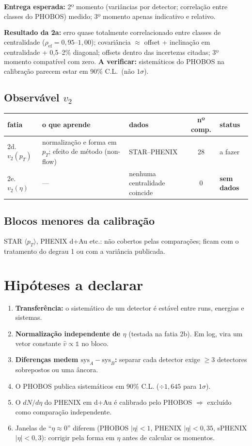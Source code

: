 \documentclass[11pt,a4paper]{article}
\newcommand{\afazer}{\textcolor{black!55}{a fazer}}
\begin{document}
\textbf{Entrega esperada:} 2º momento (variâncias por detector; correlação entre classes do PHOBOS) medido;
3º momento apenas indicativo e relativo.

\textbf{Resultado da 2a:} erro quase totalmente correlacionado entre classes de centralidade ($\rho_{\mathrm{ef}}=0{,}95$--$1{,}00$);
covariância $\approx$ offset + inclinação em centralidade + 0,5--2\% diagonal; offsets dentro das incertezas citadas;
3º momento compatível com zero. \textbf{A verificar:} sistemáticos do PHOBOS na calibração parecem estar em 90\% C.L.\ (não $1\sigma$).

\subsection*{Observável $v_2$}
\begin{tabularx}{\linewidth}{@{}l Y Y c l@{}}
\toprule
fatia & o que aprende & dados & nº comp. & status \\
\midrule
2d. $v_2(p_T)$ & normalização e forma em $p_T$; efeito de método (non-flow) & STAR--PHENIX & 28 & \afazer \\
2e. $v_2(\eta)$ & --- & nenhuma centralidade coincide & 0 & \textbf{sem dados} \\
\bottomrule
\end{tabularx}

\subsection*{Blocos menores da calibração}
STAR $\langle p_T\rangle$, PHENIX d+Au etc.: não cobertos pelas comparações; ficam com o tratamento do degrau 1 ou com a variância publicada.

\section*{Hipóteses a declarar}
\begin{enumerate}[nosep]
\item \textbf{Transferência:} o sistemático de um detector é estável entre runs, energias e sistemas.
\item \textbf{Normalização independente de $\eta$} (testada na fatia 2b). Em log, vira um vetor constante $\hat v\propto\mathbb{1}$ no bloco.
\item \textbf{Diferenças medem $\mathrm{sys}_A-\mathrm{sys}_B$:} separar cada detector exige $\geq3$ detectores sobrepostos ou uma âncora.
\item O PHOBOS publica sistemáticos em 90\% C.L. ($\div1{,}645$ para $1\sigma$).
\item O $dN/d\eta$ do PHENIX em d+Au é calibrado pelo PHOBOS $\Rightarrow$ excluído como comparação independente.
\item Janelas de ``$\eta\approx0$'' diferem (PHOBOS $|\eta|<1$, PHENIX $|\eta|<0{,}35$, sPHENIX $|\eta|<0{,}3$): corrigir pela forma em $\eta$ antes de calcular os momentos.
\end{enumerate}
\end{document}
